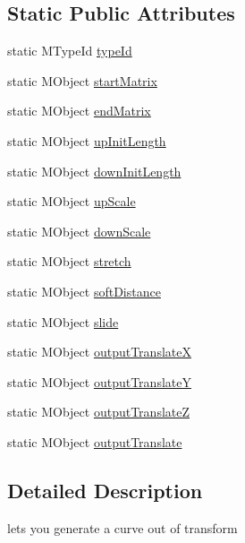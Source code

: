 \subsection*{Static Public Attributes}
\begin{DoxyCompactItemize}
\item 
static M\-Type\-Id \hyperlink{class_m_g__soft_ik_aa83471e41222b306261d20f6851548b8}{type\-Id}
\item 
static M\-Object \hyperlink{class_m_g__soft_ik_aee30f7b1a9cd369af0797452171a1656}{start\-Matrix}
\item 
static M\-Object \hyperlink{class_m_g__soft_ik_ac909738ce18e4fb5997f468c0a33cdfb}{end\-Matrix}
\item 
static M\-Object \hyperlink{class_m_g__soft_ik_a77928e84cd0a9004779b0c180082efe9}{up\-Init\-Length}
\item 
static M\-Object \hyperlink{class_m_g__soft_ik_afb62d1fde24129ba913b96afc8ec4ecc}{down\-Init\-Length}
\item 
static M\-Object \hyperlink{class_m_g__soft_ik_a756bb616c77c3f8e43ede9b9e6cb5640}{up\-Scale}
\item 
static M\-Object \hyperlink{class_m_g__soft_ik_a52416d57abfb94a331943f1fa58fd53e}{down\-Scale}
\item 
static M\-Object \hyperlink{class_m_g__soft_ik_a72bd64a9986cbb29cec8953ef4199289}{stretch}
\item 
static M\-Object \hyperlink{class_m_g__soft_ik_a4ab55903fd1f7ac8b66438ad9ea07640}{soft\-Distance}
\item 
static M\-Object \hyperlink{class_m_g__soft_ik_aeb0fdd1e018c9a49d38f64856cf0ea6c}{slide}
\item 
static M\-Object \hyperlink{class_m_g__soft_ik_afe844848e40644cf73613d0592c67d16}{output\-Translate\-X}
\item 
static M\-Object \hyperlink{class_m_g__soft_ik_a8e1a854c6ed650a85eb0ee282a0ff986}{output\-Translate\-Y}
\item 
static M\-Object \hyperlink{class_m_g__soft_ik_a81840d1c2a32bb9583990881fa327359}{output\-Translate\-Z}
\item 
static M\-Object \hyperlink{class_m_g__soft_ik_a99464e8482fc066165a2eef1cef02027}{output\-Translate}
\end{DoxyCompactItemize}


\subsection{Detailed Description}
lets you generate a curve out of transform 

